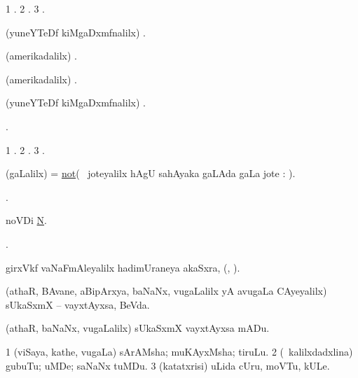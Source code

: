 \bentry
{}
\gl{\saMkiSx}
\bmng
\bnum
\num{1} . 
\num{2} . 
\num{3} . 
\enum
\emng
\eentry

\bentry
{}
\gl{\saMkiSx}
\bmng
(yuneYTeDf kiMgaDxmfnalilx) . 
\emng
\eentry

\bentry
{}
\gl{\saMkiSx}
\bmng
(amerikadalilx) . 
\emng
\eentry

\bentry
{}
\gl{\saMkiSx}
\bmng
(amerikadalilx) . 
\emng
\eentry

\bentry
{}
\gl{\saMkiSx}
\bmng
(yuneYTeDf kiMgaDxmfnalilx) . 
\emng
\eentry

\bentry
{}
\gl{\saMkiSx}
\bmng
{}. 
\emng
\eentry

\bentry
{}
\gl{\saMkiSx}
\bmng
\bnum
\num{1} . 
\num{2} . 
\num{3} . 
\enum
\emng
\eentry

\bentry
{}
\gl{\kirxvi}
\bmng
(\saMpa gaLalilx) = \hyperlink{not}{not}(\sA\  joteyalilx hAgU sahAyaka \kirx gaLAda gaLa jote \parx: ). 
\emng
\eentry

\bentry
{}
\gl{\saMkiSx}
\bmng
{}. 
\emng
\eentry

\bentry
{}
\bmng
noVDi \hyperlink{N, n}{N}. 
\emng
\eentry

\bentry
{}
\gl{\saMkiSx}
\bmng
{}. 
\emng
\eentry

\bentry
{}
\gl{\nA}
\bmng
girxVkf vaNaFmAleyalilx hadimUraneya akaSxra, (, \eng{$\nu$}). 
\emng
\eentry

\bentry
{}
\gl{\nA}
\bmng
(athaR, BAvane, aBipArxya, baNaNx, \mo vugaLalilx yA avugaLa CAyeyalilx) sUkaSxmX -- vayxtAyxsa, BeVda. 
\emng
\eentry

\bentry
{}
\gl{\sakirx}
\bmng
(athaR, baNaNx, \mo vugaLalilx) sUkaSxmX vayxtAyxsa mADu. 
\emng
\eentry

\bentry
{}
\gl{\nA}
\bmng
\bnum
\num{1} (viSaya, kathe, \mo vugaLa) sArAMsha; muKAyxMsha; tiruLu. 
\num{2} (\kanmu\ kalilxdadxlina) gubuTu; uMDe; saNaNx tuMDu. 
\num{3} (katatxrisi) uLida cUru, moVTu, kULe. 
\enum
\emng
\eentry

